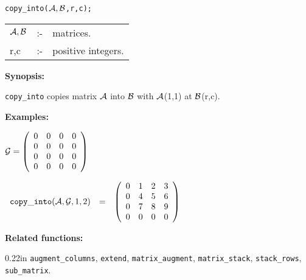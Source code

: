 \hspace*{0.175in} {\tt copy\_into(${\cal A,B}$,r,c);}

\hspace*{0.1in} 
\begin{tabular}{l l l}
${\cal A,B}$ &:-& matrices. \\
r,c          &:-& positive integers. 
\end{tabular}

{\bf Synopsis:} %

\hspace*{0.175in} {\tt copy\_into} copies matrix ${\cal A}$ into 
                ${\cal B}$ with ${\cal A}$(1,1) at ${\cal B}$(r,c).

{\bf Examples:} 

\begin{flushleft}
\hspace*{0.175in}
\begin{math}  
{\cal G} = \left( \begin{array}{cccc} 0 & 0 & 0 & 0 \\ 0 & 0 & 0 & 0 \\
0 & 0 & 0 & 0 \\ 0 & 0 & 0 & 0
\end{array} \right)
\end{math}  
\end{flushleft}

\begin{flushleft}
\hspace*{0.1in}
\begin{math}  
\begin{array}{ccc}
{\tt copy\_into}({\cal A,G},1,2) & = & 
\left( \begin{array}{cccc} 0 & 1 & 2 & 3 \\ 0 & 4 & 5 & 6 \\ 0 & 7 & 8 
& 9 \\ 0 & 0 & 0 & 0  
\end{array} \right)
\end{array}
\end{math}  
\end{flushleft}

{\bf Related functions:} 

\begin{addtolength}{\leftskip}{0.22in}
{\tt augment\_columns}, {\tt extend}, {\tt matrix\_augment}, 
{\tt matrix\_stack}, {\tt stack\_rows}, {\tt sub\_matrix}.

\end{addtolength}


